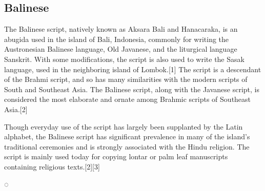\subsection{Balinese}

The Balinese script, natively known as Aksara Bali and Hanacaraka, is an abugida used in the island of Bali, Indonesia, commonly for writing the Austronesian Balinese language, Old Javanese, and the liturgical language Sanskrit. With some modifications, the script is also used to write the Sasak language, used in the neighboring island of Lombok.[1] The script is a descendant of the Brahmi script, and so has many similarities with the modern scripts of South and Southeast Asia. The Balinese script, along with the Javanese script, is considered the most elaborate and ornate among Brahmic scripts of Southeast Asia.[2]

Though everyday use of the script has largely been supplanted by the Latin alphabet, the Balinese script has significant prevalence in many of the island's traditional ceremonies and is strongly associated with the Hindu religion. The script is mainly used today for copying lontar or palm leaf manuscripts containing religious texts.[2][3]

\newfontfamily{}
\newfontfamily{}

{\indicative ◌ }

\setcounter{under}{"1B00}

